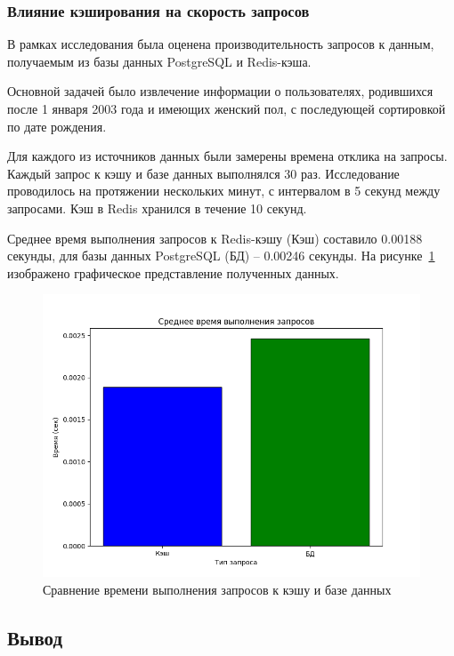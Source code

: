 \subsubsection*{\normalsize Влияние кэширования на скорость запросов}

В рамках исследования была оценена производительность запросов к данным, получаемым из базы данных PostgreSQL и Redis-кэша. 

Основной задачей было извлечение информации о пользователях, родившихся после 1 января 2003 года и имеющих женский пол, с последующей сортировкой по дате рождения.

Для каждого из источников данных были замерены времена отклика на запросы. Каждый запрос к кэшу и базе данных выполнялся 30 раз. Исследование проводилось на протяжении нескольких минут, с интервалом в 5 секунд между запросами. Кэш в Redis хранился в течение 10 секунд.

Среднее время выполнения запросов к Redis-кэшу (Кэш) составило 0.00188 секунды, для базы данных PostgreSQL (БД) -- 0.00246 секунды. На рисунке~\ref{fig:dr3} изображено графическое представление полученных данных. 

\begin{figure}[ht!]
	\begin{center}
		\includegraphics[scale=0.7]{./img/just.png}
	\end{center}
	\caption{Сравнение времени выполнения запросов к кэшу и базе данных}
	\label{fig:dr3}
\end{figure}


\subsection*{Вывод}

